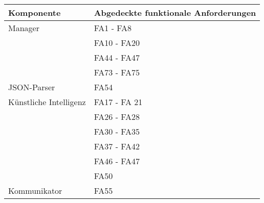 \begin{center}
	\begin{tabular}{|l|l|}
		\hline
		\textbf{Komponente} & \textbf{Abgedeckte funktionale Anforderungen}\\\hline
		Manager & FA1 - FA8\\
		& FA10 - FA20\\
		& FA44 - FA47\\
		& FA73 - FA75\\\hline
		JSON-Parser & FA54\\\hline
		Künstliche Intelligenz & FA17 - FA 21\\
		& FA26 - FA28\\
		& FA30 - FA35\\
		& FA37 - FA42\\
		&FA46 - FA47\\
		&FA50\\\hline
		Kommunikator & FA55\\\hline
		
	\end{tabular}
\end{center}
